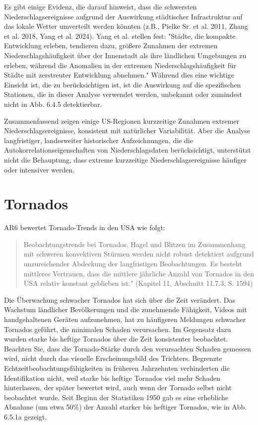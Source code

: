 \documentclass[12pt,paper=a4,DIV=12,parskip=never,chapterprefix=false,headings=standardclasses]{scrreprt}
\begin{document}
Es gibt einige Evidenz, die darauf hinweist, dass die schwersten Niederschlagsereignisse aufgrund der Auswirkung städtischer Infrastruktur auf das lokale Wetter umverteilt werden könnten (z.B., Pielke Sr. et al. 2011, Zhang et al. 2018, Yang et al. 2024). Yang et al. stellen fest: "Städte, die kompakte Entwicklung erleben, tendieren dazu, größere Zunahmen der extremen Niederschlagshäufigkeit über der Innenstadt als ihre ländlichen Umgebungen zu erleben, während die Anomalien in der extremen Niederschlagshäufigkeit für Städte mit zerstreuter Entwicklung abnehmen." Während dies eine wichtige Einsicht ist, die zu berücksichtigen ist, ist die Auswirkung auf die spezifischen Stationen, die in dieser Analyse verwendet werden, unbekannt oder zumindest nicht in Abb. 6.4.5 detektierbar.

Zusammenfassend zeigen einige US-Regionen kurzzeitige Zunahmen extremer Niederschlagsereignisse, konsistent mit natürlicher Variabilität. Aber die Analyse langfristiger, landesweiter historischer Aufzeichnungen, die die Autokorrelationseigenschaften von Niederschlagsdaten berücksichtigt, unterstützt nicht die Behauptung, dass extreme kurzzeitige Niederschlagsereignisse häufiger oder intensiver werden.

\section{Tornados}
AR6 bewertet Tornado-Trends in den USA wie folgt:

\begin{quote}
Beobachtungstrends bei Tornados, Hagel und Blitzen im Zusammenhang mit schweren konvektiven Stürmen werden nicht robust detektiert aufgrund unzureichender Abdeckung der langfristigen Beobachtungen. Es besteht mittleres Vertrauen, dass die mittlere jährliche Anzahl von Tornados in den USA relativ konstant geblieben ist." (Kapitel 11, Abschnitt 11.7.3, S. 1594)
\end{quote}

Die Überwachung schwacher Tornados hat sich über die Zeit verändert. Das Wachstum ländlicher Bevölkerungen und die zunehmende Fähigkeit, Videos mit handgehaltenen Geräten aufzunehmen, hat zu häufigeren Meldungen schwacher Tornados geführt, die minimalen Schaden verursachen. Im Gegensatz dazu wurden starke bis heftige Tornados über die Zeit konsistenter beobachtet. Beachten Sie, dass die Tornado-Stärke durch den verursachten Schaden gemessen wird, nicht durch das visuelle Erscheinungsbild des Trichters. Begrenzte Echtzeitbeobachtungsfähigkeiten in früheren Jahrzehnten verhinderten die Identifikation nicht, weil starke bis heftige Tornados viel mehr Schaden hinterlassen, der später bewertet wird, auch wenn der Tornado selbst nicht beobachtet wurde. Seit Beginn der Statistiken 1950 gab es eine erhebliche Abnahme (um etwa 50\%) der Anzahl starker bis heftiger Tornados, wie in Abb. 6.5.1a gezeigt.
\end{document}
